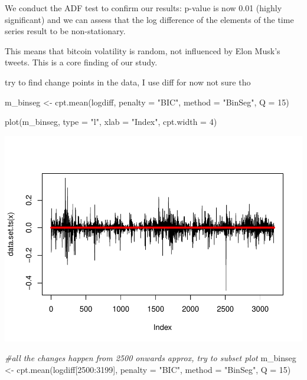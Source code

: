 \documentclass[
]{article}
\newenvironment{Shaded}{\begin{snugshade}}{\end{snugshade}}
\newcommand{\AttributeTok}[1]{\textcolor[rgb]{0.77,0.63,0.00}{#1}}
\newcommand{\CommentTok}[1]{\textcolor[rgb]{0.56,0.35,0.01}{\textit{#1}}}
\newcommand{\DecValTok}[1]{\textcolor[rgb]{0.00,0.00,0.81}{#1}}
\newcommand{\FunctionTok}[1]{\textcolor[rgb]{0.00,0.00,0.00}{#1}}
\newcommand{\NormalTok}[1]{#1}
\newcommand{\OtherTok}[1]{\textcolor[rgb]{0.56,0.35,0.01}{#1}}
\newcommand{\SpecialCharTok}[1]{\textcolor[rgb]{0.00,0.00,0.00}{#1}}
\newcommand{\StringTok}[1]{\textcolor[rgb]{0.31,0.60,0.02}{#1}}
\begin{document}
We conduct the ADF test to confirm our results: p-value is now 0.01
(highly significant) and we can assess that the log difference of the
elements of the time series result to be non-stationary.

This means that bitcoin volatility is random, not influenced by Elon
Musk's tweets. This is a core finding of our study.

try to find change points in the data, I use diff for now not sure tho

\begin{Shaded}
\begin{Highlighting}[]
\NormalTok{m\_binseg }\OtherTok{\textless{}{-}} \FunctionTok{cpt.mean}\NormalTok{(logdiff, }\AttributeTok{penalty =} \StringTok{"BIC"}\NormalTok{, }\AttributeTok{method =} \StringTok{"BinSeg"}\NormalTok{, }\AttributeTok{Q =} \DecValTok{15}\NormalTok{)}

\FunctionTok{plot}\NormalTok{(m\_binseg, }\AttributeTok{type =} \StringTok{"l"}\NormalTok{, }\AttributeTok{xlab =} \StringTok{"Index"}\NormalTok{, }\AttributeTok{cpt.width =} \DecValTok{4}\NormalTok{)}
\end{Highlighting}
\end{Shaded}

\includegraphics{Trial1_files/figure-latex/include==FALSE-1.pdf}

\begin{Shaded}
\begin{Highlighting}[]
\CommentTok{\#all the changes happen from 2500 onwards approx, try to subset plot}
\NormalTok{m\_binseg }\OtherTok{\textless{}{-}} \FunctionTok{cpt.mean}\NormalTok{(logdiff[}\DecValTok{2500}\SpecialCharTok{:}\DecValTok{3199}\NormalTok{], }\AttributeTok{penalty =} \StringTok{"BIC"}\NormalTok{, }\AttributeTok{method =} \StringTok{"BinSeg"}\NormalTok{, }\AttributeTok{Q =} \DecValTok{15}\NormalTok{)}
\end{Highlighting}
\end{Shaded}
\end{document}
